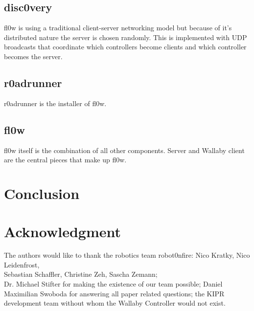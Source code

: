 \documentclass[conference]{IEEEtran}
\begin{document}
\subsection{disc0very}
fl0w is using a traditional client-server networking model but because of it's distributed nature the server is chosen randomly. This is implemented with UDP broadcasts that coordinate which controllers become clients and which controller becomes the server.

\subsection{r0adrunner}
r0adrunner is the installer of fl0w.

\subsection{fl0w}
fl0w itself is the combination of all other components. Server and Wallaby client are the central pieces that make up fl0w.


\section{Conclusion}



\section*{Acknowledgment}
The authors would like to thank the robotics team robot0nfire: Nico Kratky, Nico Leidenfrost,\\ Sebastian Schaffler, Christine Zeh, Sascha Zemann;\\ Dr. Michael Stifter for making the existence of our team possible; Daniel Maximilian Swoboda for answering all paper related questions; the KIPR development team without whom the Wallaby Controller would not exist.
\end{document}
